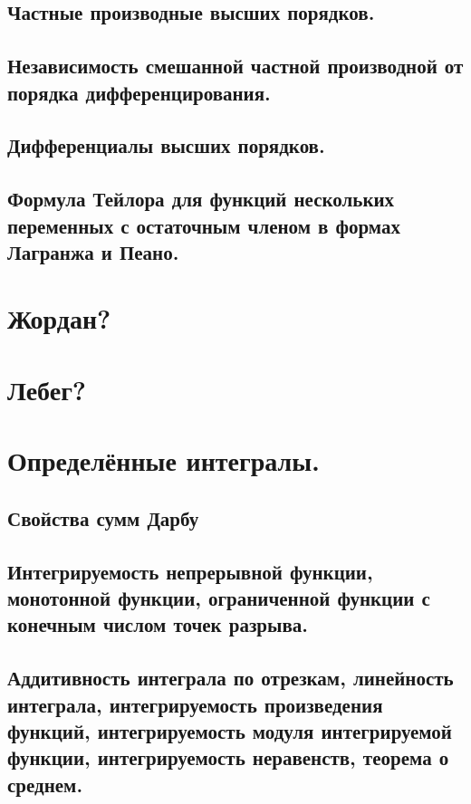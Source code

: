 \documentclass{article}
\begin{document}
\subsection{Частные производные высших порядков.}

\newpage
\subsection{Независимость смешанной частной производной от порядка дифференцирования.}

\newpage
\subsection{Дифференциалы высших порядков.}

\newpage
\subsection{Формула Тейлора для функций нескольких переменных с остаточным членом в формах Лагранжа и Пеано.}

\newpage
\section{Жордан?}

\newpage
\section{Лебег?}

\newpage
\section{Определённые интегралы.}
\subsection{Свойства сумм Дарбу}

\newpage
\subsection{Интегрируемость непрерывной функции, монотонной функции, ограниченной функции с конечным числом точек разрыва.}

\newpage
\subsection{Аддитивность интеграла по отрезкам, линейность интеграла, интегрируемость произведения функций, интегрируемость модуля интегрируемой функции, интегрируемость неравенств, теорема о среднем.}
\end{document}
